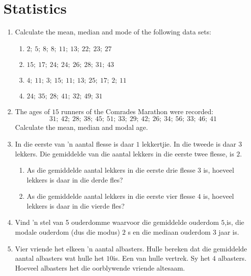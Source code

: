 \chapter{Statistics}
\begin{exercises}{}{
    \begin{enumerate}[noitemsep, label=\textbf{\arabic*}.]
    \item Calculate the mean, median and mode of the following data sets:
      \begin{enumerate}[noitemsep, label=\textbf{(\alph*)} ]
      \item $2;~5;~8;~8;~11;~13;~22;~23;~27$
      \item $15;~17;~24;~24;~26;~28;~31;~43$
      \item $4;~11;~3;~15;~11;~13;~25;~17;~2;~11$
      \item $24;~35;~28;~41;~32;~49;~31$
      \end{enumerate}
    \item The ages of $15$ runners of the Comrades Marathon were recorded:
      \begin{equation*}
        31;~42;~28;~38;~45;~51;~33;~29;~42;~26;~34;~56;~33;~46;~41
      \end{equation*}
      Calculate the mean, median and modal age.
    \item In die eerste van ’n aantal flesse is daar $1$ lekkertjie. In die tweede is daar $3$ lekkers. Die gemiddelde van die aantal lekkers in die eerste twee flesse, is $2$.
      \begin{enumerate}[noitemsep, label=\textbf{(\alph*)} ]
      \item As die gemiddelde aantal lekkers in die eerste drie flesse $3$ is, hoeveel lekkers is daar in die derde fles?
      \item As die gemiddelde aantal lekkers in die eerste vier flesse $4$ is, hoeveel lekkers is daar in die vierde fles?
      \end{enumerate}
    \item Vind ’n stel van 5 ouderdomme waarvoor die gemiddelde ouderdom $5$,is, die modale ouderdom (dus die modus) $2$ s en die mediaan ouderdom $3$ jaar is.
    \item Vier vriende het elkeen ’n aantal albasters. Hulle bereken dat die gemiddelde aantal albasters wat hulle het $10$is. Een van hulle vertrek. Sy het $4$ albasters. Hoeveel albasters het die oorblywende vriende altesaam. 
    \end{enumerate}
}
\end{exercises}


